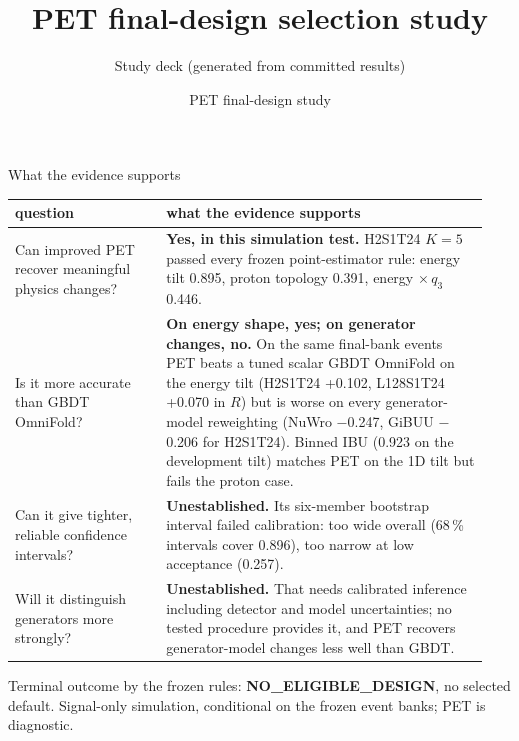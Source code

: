 \documentclass[aspectratio=169,10pt]{beamer}
\title{PET final-design selection study}
\subtitle{Study deck (generated from committed results)}
\author{PET final-design study}
\date{\parbox{0.8\linewidth}{\centering\small PET is diagnostic method development. Nothing here is a publication adoption; no historical threshold, verdict or the predecessor campaign's disposition changes; simulation only.}}
\def\evidencetext{}
\begin{document}
\gdef\evidencetext{}
\frame{\titlepage}

\gdef\evidencetext{\texttt{results/final/decision\_look1.json}; \texttt{results/final/coverage\_dev/coverage\_H2S1T24K5.json}; \texttt{../gbdt\_comparison/results/comparison.json}; \texttt{scalar/results/SCALAR\_AUSSIE\_MATCHED-20260925.json}}
\begin{frame}{What the evidence supports}
{\footnotesize
\begin{tabular}{>{\raggedright\arraybackslash}p{0.30\linewidth}>{\raggedright\arraybackslash}p{0.64\linewidth}}
\toprule
question & what the evidence supports \\
\midrule
Can improved PET recover meaningful physics changes? & \textbf{Yes, in this simulation test.} H2S1T24 $K{=}5$ passed every frozen point-estimator rule: energy tilt 0.895, proton topology 0.391, energy $\times\,q_3$ 0.446. \\
Is it more accurate than GBDT OmniFold? & \textbf{On energy shape, yes; on generator changes, no.} On the same final-bank events PET beats a tuned scalar GBDT OmniFold on the energy tilt (H2S1T24 +0.102, L128S1T24 +0.070 in $R$) but is worse on every generator-model reweighting (NuWro \ensuremath{-}0.247, GiBUU \ensuremath{-}0.206 for H2S1T24). Binned IBU (0.923 on the development tilt) matches PET on the 1D tilt but fails the proton case. \\
Can it give tighter, reliable confidence intervals? & \textbf{Unestablished.} Its six-member bootstrap interval failed calibration: too wide overall (68\,\% intervals cover 0.896), too narrow at low acceptance (0.257). \\
Will it distinguish generators more strongly? & \textbf{Unestablished.} That needs calibrated inference including detector and model uncertainties; no tested procedure provides it, and PET recovers generator-model changes less well than GBDT. \\
\bottomrule
\end{tabular}}\par\vspace{0.15cm}\scriptsize Terminal outcome by the frozen rules: \textbf{NO\_ELIGIBLE\_DESIGN}, no selected default. Signal-only simulation, conditional on the frozen event banks; PET is diagnostic.
\end{frame}
\end{document}

